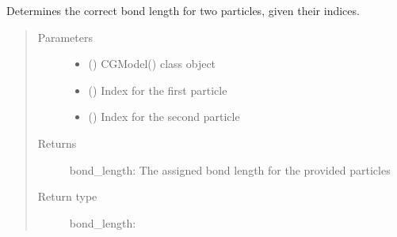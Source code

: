 \documentclass[letterpaper,12pt,english,openany,oneside]{sphinxmanual}
\begin{document}
\begin{fulllineitems}
\begin{fulllineitems}
\label{\detokenize{cg_model:cg_model.cgmodel.CGModel.get_bond_length}}
Determines the correct bond length for two particles, given their indices.
\begin{quote}\begin{description}
\item[{Parameters}] \leavevmode\begin{itemize}
\item {} 
 () \textendash{} CGModel() class object

\item {} 
 () \textendash{} Index for the first particle

\item {} 
 () \textendash{} Index for the second particle

\end{itemize}

\item[{Returns}] \leavevmode
bond\_length: The assigned bond length for the provided particles

\item[{Return type}] \leavevmode

bond\_length: 


\end{description}\end{quote}

\end{fulllineitems}



\end{fulllineitems}
\end{document}
